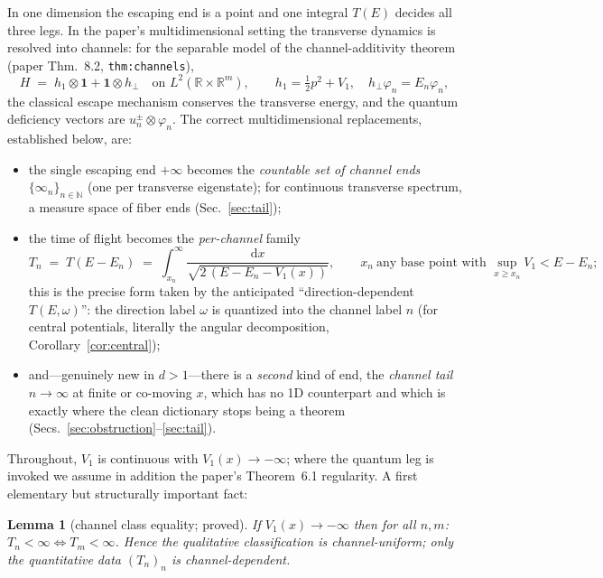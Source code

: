 \documentclass[11pt]{article}
\newtheorem{lemma}[theorem]{Lemma}
\theoremstyle{remark}
\newcommand{\dd}{\mathrm{d}}
\newcommand{\R}{\mathbb{R}}
\newcommand{\N}{\mathbb{N}}
\begin{document}
In one dimension the escaping end is a point and one integral $T(E)$
decides all three legs.  In the paper's multidimensional setting the
transverse dynamics is resolved into channels: for the separable model
of the channel-additivity theorem (paper Thm.~8.2, \texttt{thm:channels}),
\[
H \;=\; h_{1}\otimes\mathbf 1+\mathbf 1\otimes h_{\perp}
\quad\text{on } L^{2}(\R\times\R^{m}),
\qquad h_{1}=\tfrac12p^{2}+V_{1},\quad
h_{\perp}\varphi_{n}=E_{n}\varphi_{n},
\]
the classical escape mechanism conserves the transverse energy, and the
quantum deficiency vectors are $u_{n}^{\pm}\otimes\varphi_{n}$.  The
correct multidimensional replacements, established below, are:
\begin{itemize}
\item the single escaping end $+\infty$ becomes the \emph{countable set
of channel ends} $\{\infty_{n}\}_{n\in\N}$ (one per transverse
eigenstate); for continuous transverse spectrum, a measure space of
fiber ends (Sec.~\ref{sec:tail});
\item the time of flight becomes the \emph{per-channel} family
\[
T_{n}\;=\;T(E-E_{n})
\;=\;\int_{x_{n}}^{\infty}\frac{\dd x}{\sqrt{2\,(E-E_{n}-V_{1}(x))}},
\qquad
x_{n}\ \text{any base point with }\sup_{x\ge x_{n}}V_{1}<E-E_{n};
\]
this is the precise form taken by the anticipated
``direction-dependent $T(E,\omega)$'': the direction label $\omega$ is
quantized into the channel label $n$ (for central potentials,
literally the angular decomposition, Corollary~\ref{cor:central});
\item and---genuinely new in $d>1$---there is a \emph{second} kind of
end, the \emph{channel tail} $n\to\infty$ at finite or co-moving $x$,
which has no 1D counterpart and which is exactly where the clean
dictionary stops being a theorem (Secs.~\ref{sec:obstruction}--\ref{sec:tail}).
\end{itemize}

Throughout, $V_{1}$ is continuous with $V_{1}(x)\to-\infty$; where the
quantum leg is invoked we assume in addition the paper's Theorem~6.1
regularity.  A first elementary but structurally important fact:

\begin{lemma}[channel class equality; proved]\label{lem:classeq}
If $V_{1}(x)\to-\infty$ then for all $n,m$:
$T_{n}<\infty\iff T_{m}<\infty$.  Hence the \emph{qualitative}
classification is channel-uniform; only the \emph{quantitative} data
$(T_{n})_{n}$ is channel-dependent.
\end{lemma}
\end{document}
